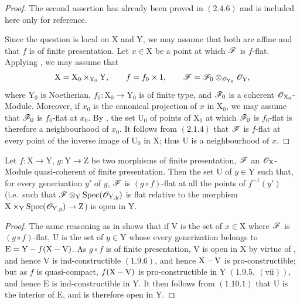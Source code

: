 \begin{proof}
The second assertion has already been proved in $(2.4.6)$ and is
included here only for reference.

Since the question is local on $\mathrm{X}$ and $\mathrm{Y}$, we may
assume that both are affine and that $f$ is of finite presentation. Let
$x\in\mathrm{X}$ be a point at which $\mathscr{F}$ is $f$-flat. Applying
, we may assume that
\[
  \mathrm{X}=\mathrm{X}_0\times_{\mathrm{Y}_0}\mathrm{Y},
  \qquad
  f=f_0\times 1,
  \qquad
  \mathscr{F}
  =\mathscr{F}_0\otimes_{\mathscr{O}_{\mathrm{Y}_0}}\mathscr{O}_\mathrm{Y},
\]
where $\mathrm{Y}_0$ is Noetherian,
$f_0:\mathrm{X}_0\to\mathrm{Y}_0$ is of finite type, and
$\mathscr{F}_0$ is a coherent $\mathscr{O}_{\mathrm{X}_0}$-Module. Moreover, if
$x_0$ is the canonical projection of $x$ in $\mathrm{X}_0$, we may
assume that $\mathscr{F}_0$ is $f_0$-flat at $x_0$. By
, the set $\mathrm{U}_0$ of points of
$\mathrm{X}_0$ at which $\mathscr{F}_0$ is $f_0$-flat is therefore a
neighbourhood of $x_0$. It follows from $(2.1.4)$ that $\mathscr{F}$ is
$f$-flat at every point of the inverse image of $\mathrm{U}_0$ in
$\mathrm{X}$; thus $\mathrm{U}$ is a neighbourhood of $x$.
\end{proof}


\begin{corollary}[11.3.2]
\label{IV.11.3.2}
Let $f:\mathrm{X}\to\mathrm{Y}$, $g:\mathrm{Y}\to\mathrm{Z}$ be two morphisms of finite presentation, $\mathscr{F}$ an $\mathscr{O}_\mathrm{X}$-Module quasi-coherent of finite presentation. Then the set $\mathrm{U}$ of $y\in\mathrm{Y}$ such that, for every generization $y'$ of $y$, $\mathscr{F}$ is $(g\circ f)$-flat at all the points of $f^{-1}(y')$ \textup{(i.e.\ }such that $\mathscr{F}\otimes_\mathrm{Y}\operatorname{Spec}(\mathscr{O}_{\mathrm{Y},y})$ is flat relative to the morphism $\mathrm{X}\times_\mathrm{Y}\operatorname{Spec}(\mathscr{O}_{\mathrm{Y},y})\to\mathrm{Z}$\textup{)} is open in $\mathrm{Y}$.
\end{corollary}

\begin{proof}
The same reasoning as in  shows that if $\mathrm{V}$ is the set of $x\in\mathrm{X}$ where $\mathscr{F}$ is $(g\circ f)$-flat, $\mathrm{U}$ is the set of $y\in\mathrm{Y}$ whose every generization belongs to $\mathrm{E}=\mathrm{Y}- f(\mathrm{X}-\mathrm{V})$. As $g\circ f$ is of finite presentation, $\mathrm{V}$ is open in $\mathrm{X}$ by virtue of , and hence $\mathrm{V}$ is ind-constructible $(1.9.6)$, and hence $\mathrm{X}-\mathrm{V}$ is pro-constructible; but as $f$ is quasi-compact, $f(\mathrm{X}-\mathrm{V})$ is pro-constructible in $\mathrm{Y}$ $(1.9.5,~(\mathrm{vii}))$, and hence $\mathrm{E}$ is ind-constructible in $\mathrm{Y}$. It then follows from $(1.10.1)$ that $\mathrm{U}$ is the interior of $\mathrm{E}$, and is therefore open in $\mathrm{Y}$.
\end{proof}

